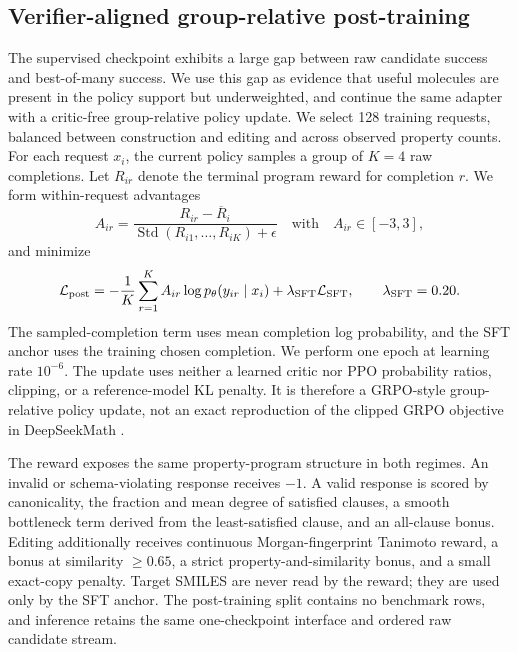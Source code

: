 \subsection{Verifier-aligned group-relative post-training}
The supervised checkpoint exhibits a large gap between raw candidate success
and best-of-many success. We use this gap as evidence that useful molecules are
present in the policy support but underweighted, and continue the same adapter
with a critic-free group-relative policy update. We select 128 training
requests, balanced between construction and editing and across observed
property counts. For each request $x_i$, the current policy samples a group of
$K=4$ raw completions. Let $R_{ir}$ denote the terminal program reward for
completion $r$. We form within-request advantages
\begin{equation}
  A_{ir}=\frac{R_{ir}-\overline R_i}
  {\operatorname{Std}(R_{i1},\ldots,R_{iK})+\epsilon}
  \quad\text{with}\quad A_{ir}\in[-3,3],
  \label{eq:group-advantage}
\end{equation}
and minimize
\begin{equation}
  \mathcal L_{\rm post}
  =-\frac{1}{K}\sum_{r=1}^{K}A_{ir}
  \log p_\theta(y_{ir}\mid x_i)
  +\lambda_{\rm SFT}\mathcal L_{\rm SFT},
  \qquad \lambda_{\rm SFT}=0.20.
  \label{eq:group-policy-objective}
\end{equation}
The sampled-completion term uses mean completion log probability, and the SFT
anchor uses the training chosen completion. We perform one epoch at learning
rate $10^{-6}$. The update uses neither a learned critic nor PPO probability
ratios, clipping, or a reference-model KL penalty. It is therefore a
GRPO-style group-relative policy update, not an exact reproduction of the
clipped GRPO objective in DeepSeekMath \citep{shao2024deepseekmath}.

The reward exposes the same property-program structure in both regimes. An
invalid or schema-violating response receives $-1$. A valid response is scored
by canonicality, the fraction and mean degree of satisfied clauses, a smooth
bottleneck term derived from the least-satisfied clause, and an all-clause
bonus. Editing additionally receives continuous Morgan-fingerprint Tanimoto
reward, a bonus at similarity $\geq0.65$, a strict property-and-similarity
bonus, and a small exact-copy penalty. Target SMILES are never read by the
reward; they are used only by the SFT anchor. The post-training split contains
no benchmark rows, and inference retains the same one-checkpoint interface and
ordered raw candidate stream.
